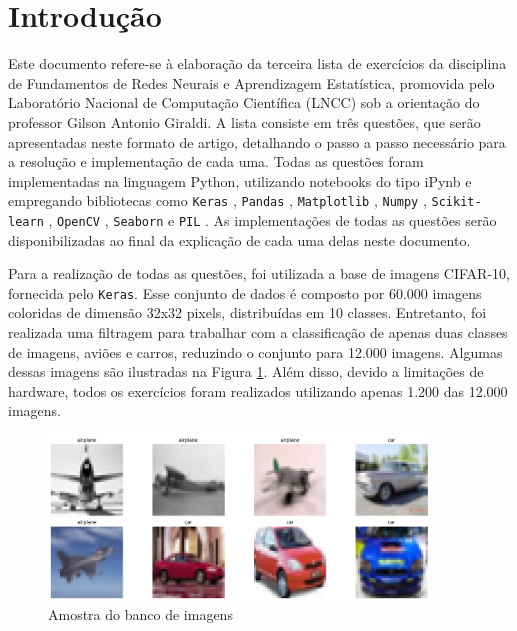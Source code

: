 \documentclass[]{abntex2}
\begin{document}
\frenchspacing 

\maketitle

\section*{\textbf{Introdução}}

Este documento refere-se à elaboração da terceira lista de exercícios da disciplina de Fundamentos de Redes Neurais e Aprendizagem Estatística, promovida pelo Laboratório Nacional de Computação Científica (LNCC) sob a orientação do professor Gilson Antonio Giraldi. A lista consiste em três questões, que serão apresentadas neste formato de artigo, detalhando o passo a passo necessário para a resolução e implementação de cada uma. Todas as questões foram implementadas na linguagem Python, utilizando notebooks do tipo iPynb e empregando bibliotecas como \texttt{Keras} \cite{keras}, \texttt{Pandas} \cite{pandas}, \texttt{Matplotlib} \cite{matplotlib}, \texttt{Numpy} \cite{numpy}, \texttt{Scikit-learn} \cite{scikit-learn}, \texttt{OpenCV} \cite{opencv}, \texttt{Seaborn} \cite{seaborn} e \texttt{PIL} \cite{pillow}. As implementações de todas as questões serão disponibilizadas ao final da explicação de cada uma delas neste documento.

Para a realização de todas as questões, foi utilizada a base de imagens CIFAR-10, fornecida pelo \texttt{Keras}. Esse conjunto de dados é composto por 60.000 imagens coloridas de dimensão 32x32 pixels, distribuídas em 10 classes. Entretanto, foi realizada uma filtragem para trabalhar com a classificação de apenas duas classes de imagens, aviões e carros, reduzindo o conjunto para 12.000 imagens. Algumas dessas imagens são ilustradas na Figura \ref{fig:amostra}. Além disso, devido a limitações de hardware, todos os exercícios foram realizados utilizando apenas 1.200 das 12.000 imagens.

\begin{figure}[H]
    \centering 
    \includegraphics[width=0.9\textwidth]{imgs/introduction/amostra.png}
    \caption{Amostra do banco de imagens}
    \label{fig:amostra} %
\end{figure}
\end{document}
